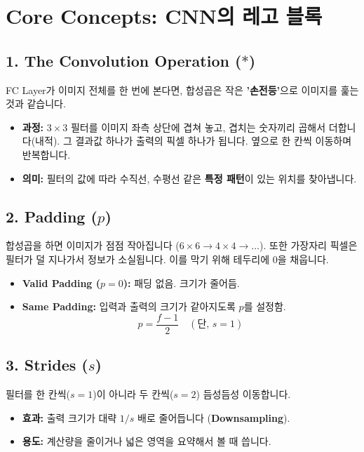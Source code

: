 \documentclass[11pt,a4paper]{book}
\theoremstyle{definition}
\begin{document}
\section{Core Concepts: CNN의 레고 블록}

\subsection{1. The Convolution Operation ($*$)}
FC Layer가 이미지 전체를 한 번에 본다면, 합성곱은 작은 \textbf{'손전등'}으로 이미지를 훑는 것과 같습니다.


\begin{itemize}
    \item \textbf{과정:} $3 \times 3$ 필터를 이미지 좌측 상단에 겹쳐 놓고, 겹치는 숫자끼리 곱해서 더합니다(내적). 그 결과값 하나가 출력의 픽셀 하나가 됩니다. 옆으로 한 칸씩 이동하며 반복합니다.
    \item \textbf{의미:} 필터의 값에 따라 수직선, 수평선 같은 \textbf{특정 패턴}이 있는 위치를 찾아냅니다.
\end{itemize}

\subsection{2. Padding ($p$)}


합성곱을 하면 이미지가 점점 작아집니다 ($6 \times 6 \to 4 \times 4 \to \dots$). 또한 가장자리 픽셀은 필터가 덜 지나가서 정보가 소실됩니다.
이를 막기 위해 테두리에 0을 채웁니다.
\begin{itemize}
    \item \textbf{Valid Padding ($p=0$):} 패딩 없음. 크기가 줄어듬.
    \item \textbf{Same Padding:} 입력과 출력의 크기가 같아지도록 $p$를 설정함.
    $$ p = \frac{f-1}{2} \quad (\text{단, } s=1) $$
\end{itemize}

\subsection{3. Strides ($s$)}
필터를 한 칸씩($s=1$)이 아니라 두 칸씩($s=2$) 듬성듬성 이동합니다.
\begin{itemize}
    \item \textbf{효과:} 출력 크기가 대략 $1/s$ 배로 줄어듭니다 (\textbf{Downsampling}).
    \item \textbf{용도:} 계산량을 줄이거나 넓은 영역을 요약해서 볼 때 씁니다.
\end{itemize}
\end{document}
